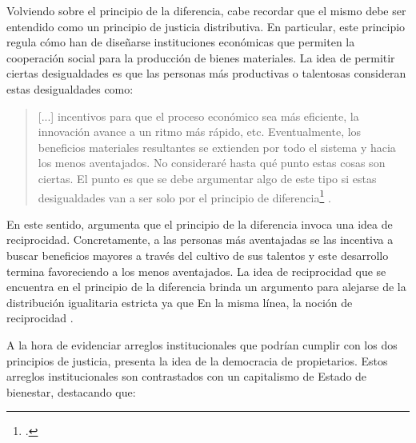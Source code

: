 Volviendo sobre el principio de la diferencia, cabe recordar que el mismo debe ser entendido como un principio de justicia distributiva. En particular, este principio regula cómo han de diseñarse instituciones económicas que permiten la cooperación social para la producción de bienes materiales. La idea de permitir ciertas desigualdades es que las personas más productivas o talentosas consideran estas desigualdades como:

\vspace{3mm}
\begin{quote}
   [...] incentivos para que el proceso económico sea más eficiente, la innovación avance a un ritmo más rápido, etc. Eventualmente, los beneficios materiales resultantes se extienden por todo el sistema y hacia los menos aventajados. No consideraré hasta qué punto estas cosas son ciertas. El punto es que se debe argumentar algo de este tipo si estas desigualdades van a ser solo por el principio de diferencia\footnote{ \citep[p. 71]{Rawls_1971}.} \citep[p. 71]{Rawls_1971}.
\end{quote}
\vspace{3mm}

En este sentido, \citet{Rawls_2002} argumenta que el principio de la diferencia invoca una idea de reciprocidad. Concretamente, a las personas más aventajadas se las incentiva a buscar beneficios mayores a través del cultivo de sus talentos y este desarrollo termina favoreciendo a los menos aventajados. La idea de reciprocidad que se encuentra en el principio de la diferencia brinda un argumento para alejarse de la distribución igualitaria estricta ya que  \citep[p. 169]{Rawls_2002} En la misma línea, la noción de reciprocidad  \citep[p. 170]{Rawls_2002}. 

A la hora de evidenciar arreglos institucionales que podrían cumplir con los dos principios de justicia, \citet{Rawls_2002} presenta la idea de la democracia de propietarios. Estos arreglos institucionales son contrastados con un capitalismo de Estado de bienestar, destacando que:

